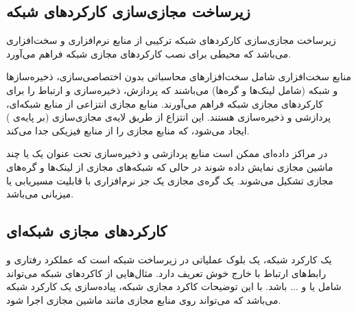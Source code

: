 \subsection{زیرساخت مجازی‌سازی کارکردهای شبکه}
زیرساخت مجازی‌سازی کارکردهای شبکه ترکیبی از منابع نرم‌افزاری و سخت‌افزاری می‌باشد
که محیطی برای نصب
کارکردهای مجازی شبکه فراهم می‌آورد.

منابع سخت‌افزاری شامل سخت‌افزارهای محاسباتی بدون اختصاصی‌سازی،
ذخیره‌سازها و شبکه
(شامل لینک‌ها و گره‌ها)
می‌باشند
که پردازش، ذخیره‌سازی و ارتباط را
برای کارکردهای مجازی شبکه فراهم می‌آورند.
منابع مجازی انتزاعی از منابع شبکه‌ای، پردازشی و ذخیر‌ه‌سازی هستند.
این انتزاع از طریق لایه‌ی مجازی‌سازی (بر پایه‌ی ) ایجاد می‌شود،
که منابع مجازی را از منابع فیزیکی جدا می‌کند.

در مراکز داده‌ای ممکن است منابع پردازشی و ذخیره‌سازی تحت عنوان یک یا چند
ماشین مجازی نمایش داده شوند در حالی که شبکه‌های مجازی از لینک‌ها و گره‌های مجازی تشکیل می‌شوند.
یک گره‌ی مجازی یک جز نرم‌افزاری با قابلیت مسیریابی یا میزبانی می‌باشد.

\subsection{کارکردهای مجازی شبکه‌ای}
یک کارکرد شبکه، یک بلوک عملیاتی در زیرساخت شبکه است که عملکرد رفتاری و رابط‌های ارتباط با خارج خوش تعریف دارد.
مثال‌هایی از کاکردهای شبکه می‌تواند شامل
یا
و ... باشد.
با این توضیحات کاکرد مجازی شبکه، پیاده‌سازی یک کارکرد شبکه می‌باشد
که می‌تواند روی منابع مجازی مانند ماشین مجازی اجرا شود.